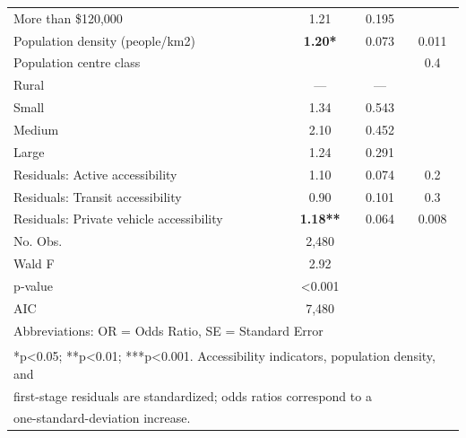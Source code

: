 \documentclass[preprint, 3p,
authoryear]{elsarticle} %
\begin{document}
\begin{table}
\begin{tabular}[t]{lccc}
\addlinespace
\hspace{1em}More than \$120,000 & 1.21 & 0.195 & \\
Population density (people/km2) & \textbf{1.20*} & 0.073 & 0.011\\
Population centre class &  &  & 0.4\\
\hspace{1em}Rural & — & — & \\
\hspace{1em}Small & 1.34 & 0.543 & \\
\addlinespace
\hspace{1em}Medium & 2.10 & 0.452 & \\
\hspace{1em}Large & 1.24 & 0.291 & \\
Residuals: Active accessibility & 1.10 & 0.074 & 0.2\\
Residuals: Transit accessibility & 0.90 & 0.101 & 0.3\\
Residuals: Private vehicle accessibility & \textbf{1.18**} & 0.064 & 0.008\\
\midrule
\addlinespace
No. Obs. & 2,480 &  & \\
Wald F & 2.92 &  & \\
p‑value & <0.001 &  & \\
AIC & 7,480 &  & \\
\bottomrule
\multicolumn{4}{l}{\rule{0pt}{1em}Abbreviations: OR = Odds Ratio, SE = Standard Error}\\
\multicolumn{4}{l}{\textsuperscript{} *p<0.05; **p<0.01; ***p<0.001.  Accessibility indicators, population density, and}\\
\multicolumn{4}{l}{first-stage residuals are standardized; odds ratios correspond to a}\\
\multicolumn{4}{l}{one-standard-deviation increase.}\\
\end{tabular}
\end{table}

\renewcommand\refname{References}

\end{document}
